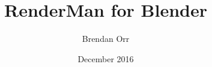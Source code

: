 \documentclass[letterpaper,12pt,twoside]{book}
\begin{document}
\author{Brendan Orr}
\title{RenderMan for Blender}
\date{December 2016}



\frontmatter
\maketitle


\pagestyle{fancy}
\fancyhead{}
\fancyfoot{}
\fancyfoot[RO,LE]{\thepage}

\renewcommand{\headrulewidth}{0.4pt}
\renewcommand{\footrulewidth}{0.4pt}
\renewcommand{\voffset}{0.0pt}

\tableofcontents
\mainmatter









\backmatter
\end{document}
